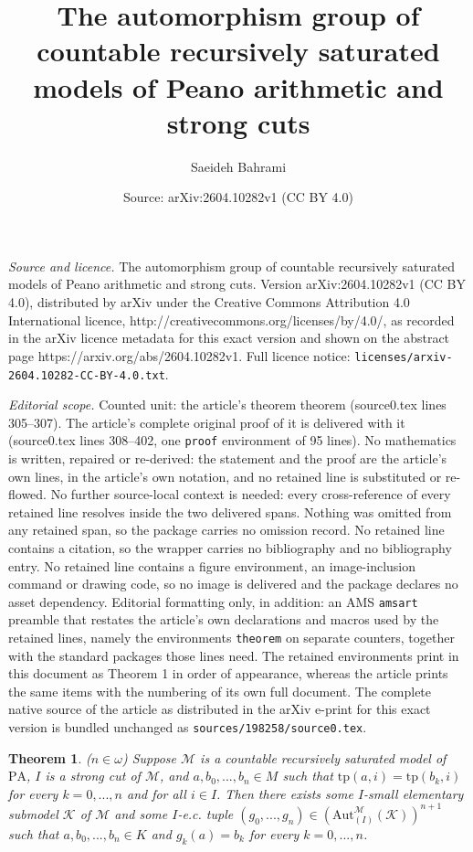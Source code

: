 \documentclass[10pt,a4paper]{amsart}
\title{The automorphism group of countable recursively saturated models of Peano arithmetic and strong cuts}
\author{Saeideh Bahrami}
\date{Source: arXiv:2604.10282v1 (CC BY 4.0)}
\newtheorem{theorem}{Theorem}
\newcommand{\A}{\mathrm{Aut}}
\newcommand{\Aa}{\A_{(I)}^{\M}(\K)}
\newcommand{\K}{\mathcal{K}}
\newcommand{\M}{\mathcal{M}}
\newcommand{\pa}{\mathrm{PA}}
\newcommand{\tp}{\mathrm{tp}}
\begin{document}
\maketitle

\noindent\emph{Source and licence.} The automorphism group of countable recursively saturated models of Peano arithmetic and strong cuts. Version arXiv:2604.10282v1 (CC BY 4.0), distributed by arXiv under the Creative Commons Attribution 4.0 International licence, http://creativecommons.org/licenses/by/4.0/, as recorded in the arXiv licence metadata for this exact version and shown on the abstract page https://arxiv.org/abs/2604.10282v1. Full licence notice: \texttt{licenses/arxiv-2604.10282-CC-BY-4.0.txt}.\par\smallskip

\noindent\textit{Editorial scope.} Counted unit: the article's theorem theorem (source0.tex lines 305--307). The article's complete original proof of it is delivered with it (source0.tex lines 308--402, one \texttt{proof} environment of 95 lines). No mathematics is written, repaired or re-derived: the statement and the proof are the article's own lines, in the article's own notation, and no retained line is substituted or re-flowed.  No further source-local context is needed: every cross-reference of every retained line resolves inside the two delivered spans.  Nothing was omitted from any retained span, so the package carries no omission record.  No retained line contains a citation, so the wrapper carries no bibliography and no bibliography entry.  No retained line contains a figure environment, an image-inclusion command or drawing code, so no image is delivered and the package declares no asset dependency.  Editorial formatting only, in addition: an AMS \texttt{amsart} preamble that restates the article's own declarations and macros used by the retained lines, namely the environments \texttt{theorem} on separate counters, together with the standard packages those lines need.  The retained environments print in this document as Theorem 1 in order of appearance, whereas the article prints the same items with the numbering of its own full document.  The complete native source of the article as distributed in the arXiv e-print for this exact version is bundled unchanged as \texttt{sources/198258/source0.tex}.
\begin{theorem}
	($n\in\omega$)	Suppose $ \M $ is a countable  recursively saturated model of $ \pa $, $I$ is a strong cut of $\M$, and $ a,b_{0},...,b_{n}\in M $ such that $ \tp(a,i)=\tp(b_{k},i) $ for every $k=0,...,n$ and for all $i\in I$. Then there exists some $I$-small elementary submodel $ \K $ of $\M$  and some $I$-e.c.  tuple $ (g_{0},...,g_{n})\in(\Aa)^{n+1} $ such that $ a,b_{0},...,b_{n}\in K $ and $ g_{k}(a)=b_{k} $ for every $k=0,...,n$.
\end{theorem}
\end{document}
